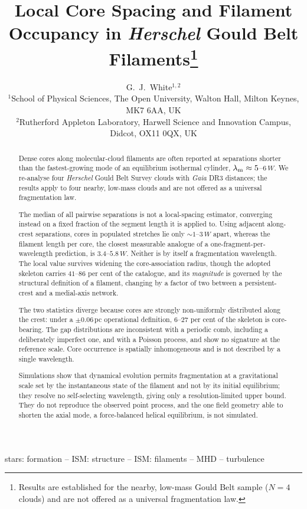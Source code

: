 \documentclass[usenatbib,twoside,twocolumn]{mnras}
\title[Core spacing and filament occupancy in HGBS filaments]{Local Core Spacing and Filament Occupancy in \textit{Herschel} Gould Belt Filaments\thanks{Results are established for the nearby, low-mass Gould Belt sample ($N=4$ clouds) and are not offered as a universal fragmentation law.}}
\author[G.~J.~White]{G.~J.~White$^{1,2}$\\
$^{1}$School of Physical Sciences, The Open University, Walton Hall, Milton Keynes, MK7 6AA, UK\\
$^{2}$Rutherford Appleton Laboratory, Harwell Science and Innovation Campus, Didcot, OX11 0QX, UK}
\begin{document}
\maketitle

\begin{abstract}
Dense cores along molecular-cloud filaments are often reported at separations shorter than the fastest-growing mode of an equilibrium isothermal cylinder, $\lambda_{\rm m}\approx5$--$6\,W$. We re-analyse four \textit{Herschel} Gould Belt Survey clouds with \textit{Gaia} DR3 distances; the results apply to four nearby, low-mass clouds and are not offered as a universal fragmentation law.

The median of all pairwise separations is not a local-spacing estimator, converging instead on a fixed fraction of the segment length it is applied to. Using adjacent along-crest separations, cores in populated stretches lie only $\sim1$--$3\,W$ apart, whereas the filament length per core, the closest measurable analogue of a one-fragment-per-wavelength prediction, is $3.4$--$5.8\,W$. Neither is by itself a fragmentation wavelength. The local value survives widening the core-association radius, though the adopted skeleton carries $41$--$86$ per cent of the catalogue, and its \emph{magnitude} is governed by the structural definition of a filament, changing by a factor of two between a persistent-crest and a medial-axis network.

The two statistics diverge because cores are strongly non-uniformly distributed along the crest: under a $\pm0.06$\,pc operational definition, $6$--$27$ per cent of the skeleton is core-bearing. The gap distributions are inconsistent with a periodic comb, including a deliberately imperfect one, and with a Poisson process, and show no signature at the reference scale. Core occurrence is spatially inhomogeneous and is not described by a single wavelength.

Simulations show that dynamical evolution permits fragmentation at a gravitational scale set by the instantaneous state of the filament and not by its initial equilibrium; they resolve no self-selecting wavelength, giving only a resolution-limited upper bound. They do not reproduce the observed point process, and the one field geometry able to shorten the axial mode, a force-balanced helical equilibrium, is not simulated.
\end{abstract}

\begin{keywords}
stars: formation -- ISM: structure -- ISM: filaments -- MHD -- turbulence
\end{keywords}
\end{document}
